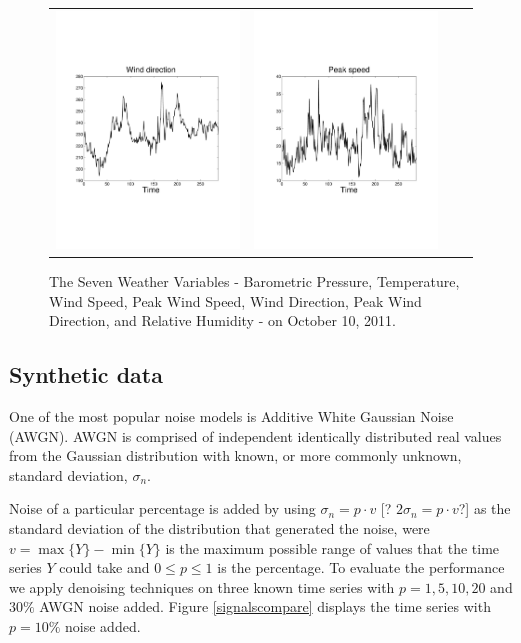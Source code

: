\documentclass[11pt]{article}
\theoremstyle{definition}
\begin{document}
\begin{figure}[h!]
\begin{center}
\begin{tabular}{cccc}
\includegraphics[trim=2.5cm 8cm 3cm 5cm,width=0.22\columnwidth]{201110_1day_B4.pdf} &
\includegraphics[trim=2.5cm 8cm 3cm 5cm,width=0.22\columnwidth]{201110_1day_B6.pdf} & \\
\end{tabular}
\end{center}
\vspace{-0.05in}
\caption{\small The Seven Weather Variables - Barometric Pressure,
  Temperature, Wind Speed, Peak Wind Speed, Wind Direction, Peak Wind
  Direction, and Relative Humidity - on October 10, 2011.}
\vspace{-0.15in}
\label{fig:weather_oct2011}
\end{figure}

\subsection{Synthetic data} 

One of the most popular noise models is Additive White Gaussian Noise
(AWGN). AWGN is comprised of independent identically
distributed real values from the Gaussian distribution with known, or
more commonly unknown, standard deviation, $\sigma_n$. 

Noise of a particular percentage is added by using $\sigma_n = p\cdot
v$ [? $2\sigma_n = p\cdot v$?] as the standard deviation of the
distribution that generated the noise, were $v =\max\{Y\} - \min\{Y\}$
is the maximum possible range of values that the time series $Y$ could
take and $0\leq p\leq 1$ is the percentage. To evaluate the
performance we apply denoising techniques on three known time series
with $ p = 1, 5, 10, 20$ and $30 \%$ AWGN noise added. Figure
\ref{signalscompare} displays the time series with $ p = 10\%$ noise
added.
\end{document}
